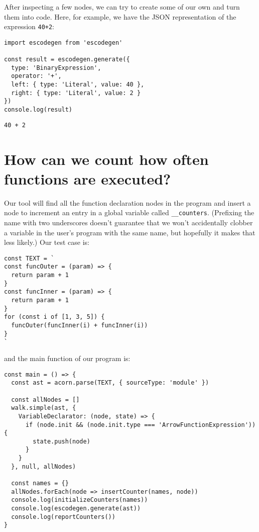 \documentclass[krantzl]{krantz}
\begin{document}
After inspecting a few nodes,
we can try to create some of our own and turn them into code.
Here,
for example,
we have the JSON representation of the expression \texttt{40+2}:


\begin{lstlisting}[frame=tblr]
import escodegen from 'escodegen'

const result = escodegen.generate({
  type: 'BinaryExpression',
  operator: '+',
  left: { type: 'Literal', value: 40 },
  right: { type: 'Literal', value: 2 }
})
console.log(result)
\end{lstlisting}



\begin{lstlisting}[frame=tblr,backgroundcolor=\color{black!5}]
40 + 2
\end{lstlisting}


\section{How can we count how often functions are executed?}\label{code-generator-count}


Our tool will find all the function declaration nodes in the program
and insert a node to increment an entry in a global variable called \texttt{\_\_counters}.
(Prefixing the name with two underscores doesn’t guarantee that
we won’t accidentally clobber a variable in the user’s program with the same name,
but hopefully it makes that less likely.)
Our test case is:


\begin{lstlisting}[frame=tblr]
const TEXT = `
const funcOuter = (param) => {
  return param + 1
}
const funcInner = (param) => {
  return param + 1
}
for (const i of [1, 3, 5]) {
  funcOuter(funcInner(i) + funcInner(i))
}
`
\end{lstlisting}



\noindent and the main function of our program is:


\begin{lstlisting}[frame=tblr]
const main = () => {
  const ast = acorn.parse(TEXT, { sourceType: 'module' })

  const allNodes = []
  walk.simple(ast, {
    VariableDeclarator: (node, state) => {
      if (node.init && (node.init.type === 'ArrowFunctionExpression')) {
        state.push(node)
      }
    }
  }, null, allNodes)

  const names = {}
  allNodes.forEach(node => insertCounter(names, node))
  console.log(initializeCounters(names))
  console.log(escodegen.generate(ast))
  console.log(reportCounters())
}
\end{lstlisting}
\end{document}
